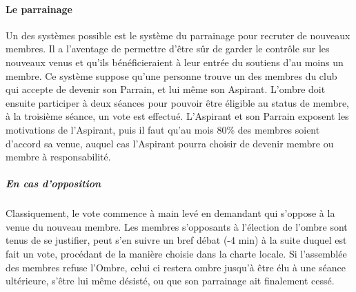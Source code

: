 \documentclass[a4paper,12pt]{article}
\begin{document}
\paragraph{Le parrainage}
Un des systèmes possible est le système du parrainage pour recruter de nouveaux membres. Il a l'aventage de permettre d'être sûr de garder le contrôle sur les nouveaux venus et qu'ils bénéficieraient à leur entrée du soutiens d'au moins un membre. Ce système suppose qu'une personne trouve un des membres du club qui accepte de devenir son Parrain, et lui même son Aspirant. L'ombre doit ensuite participer à deux séances pour pouvoir être éligible au status de membre, à la troisième séance, un vote est effectué. L'Aspirant et son Parrain exposent les motivations de l'Aspirant, puis il faut qu'au mois 80\% des membres soient d'accord sa venue, auquel cas l'Aspirant pourra choisir de devenir membre ou membre à responsabilité.
\subparagraph{En cas d'opposition}
Classiquement, le vote commence à main levé en demandant qui s'oppose à la venue du nouveau membre. Les membres s'opposants à l'élection de l'ombre sont tenus de se justifier, peut s'en suivre un bref débat (-4 min) à la suite duquel est fait un vote, procédant de la manière choisie dans la charte locale. Si l'assemblée des membres refuse l'Ombre, celui ci restera ombre jusqu'à être élu à une séance ultérieure, s'être lui même désisté, ou que son parrainage ait finalement cessé.
\end{document}
